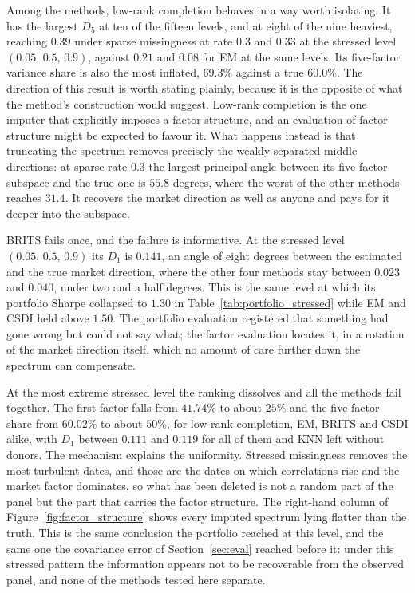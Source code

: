 Among the methods, low-rank completion behaves in a way worth isolating. It has
the largest $D_5$ at ten of the fifteen levels, and at eight of the nine
heaviest, reaching $0.39$ under sparse missingness at rate $0.3$ and $0.33$ at
the stressed level $(0.05,\,0.5,\,0.9)$, against $0.21$ and $0.08$ for EM at the
same levels. Its five-factor variance share is also the most inflated, $69.3\%$
against a true $60.0\%$. The direction of this result is worth stating plainly,
because it is the opposite of what the method's construction would suggest.
Low-rank completion is the one imputer that explicitly imposes a factor
structure,
and an evaluation of factor structure might be expected to favour it. What
happens instead is that truncating the spectrum removes precisely the weakly
separated middle directions: at sparse rate $0.3$ the largest principal angle
between its five-factor subspace and the true one is $55.8$ degrees, where the
worst of the other methods reaches $31.4$. It recovers the market direction as
well as anyone and pays for it deeper into the subspace.

BRITS fails once, and the failure is informative. At the stressed level
$(0.05,\,0.5,\,0.9)$ its $D_1$ is $0.141$, an angle of eight degrees between the
estimated and the true market direction, where the other four methods stay
between $0.023$ and $0.040$, under two and a half degrees. This is the same level at which its portfolio Sharpe
collapsed to $1.30$ in Table~\ref{tab:portfolio_stressed} while EM and CSDI held
above $1.50$. The portfolio evaluation registered that something had gone wrong
but could not say what; the factor evaluation locates it, in a rotation of the
market direction itself, which no amount of care further down the spectrum can
compensate.

At the most extreme stressed level the ranking dissolves and all the methods
fail together. The first factor falls from $41.74\%$ to about $25\%$ and the
five-factor share from $60.02\%$ to about $50\%$, for low-rank completion, EM,
BRITS and CSDI alike, with $D_1$ between $0.111$ and $0.119$ for all of them and
KNN left without donors. The mechanism explains the uniformity. Stressed
missingness removes the most turbulent dates, and those are the dates on which
correlations rise and the market factor dominates, so what has been deleted is
not a random part of the panel but the part that carries the factor structure.
The right-hand column of Figure~\ref{fig:factor_structure} shows every imputed
spectrum lying flatter than the truth. This is the same conclusion the portfolio
reached at this level, and the same one the covariance error of
Section~\ref{sec:eval} reached before it: under this stressed pattern the
information appears not to be recoverable from the observed panel, and none of
the methods tested here separate.

